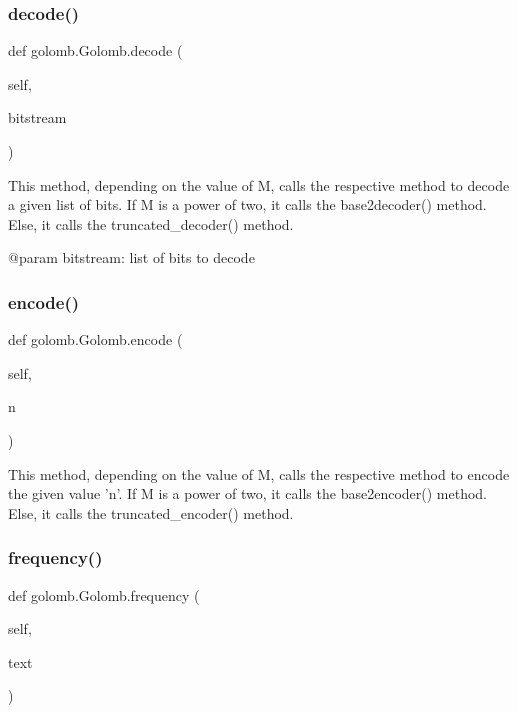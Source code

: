 \subsubsection{\texorpdfstring{decode()}{decode()}}
{\footnotesize\ttfamily def golomb.\+Golomb.\+decode (\begin{DoxyParamCaption}\item[{}]{self,  }\item[{}]{bitstream }\end{DoxyParamCaption})}

\begin{DoxyVerb}This method, depending on the value of M, calls the respective method to decode a given list of bits.
If M is a power of two, it calls the base2decoder() method. Else, it calls the truncated_decoder() method.

@param bitstream: list of bits to decode
\end{DoxyVerb}
 \mbox{\label{classgolomb_1_1Golomb_ac90e895ad77bd4424f1ea5830536a4f3}} 
\subsubsection{\texorpdfstring{encode()}{encode()}}
{\footnotesize\ttfamily def golomb.\+Golomb.\+encode (\begin{DoxyParamCaption}\item[{}]{self,  }\item[{}]{n }\end{DoxyParamCaption})}

\begin{DoxyVerb}This method, depending on the value of M, calls the respective method to encode the given value 'n'.
If M is a power of two, it calls the base2encoder() method. Else, it calls the truncated_encoder() method.
\end{DoxyVerb}
 \mbox{\label{classgolomb_1_1Golomb_aa3ed6d7b2c9a1cea28df7dbc3962dacc}} 
\subsubsection{\texorpdfstring{frequency()}{frequency()}}
{\footnotesize\ttfamily def golomb.\+Golomb.\+frequency (\begin{DoxyParamCaption}\item[{}]{self,  }\item[{}]{text }\end{DoxyParamCaption})}

